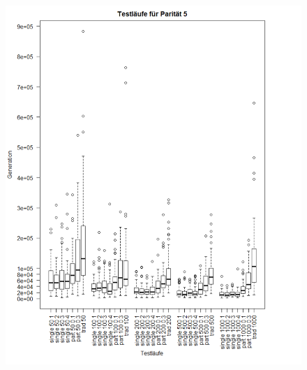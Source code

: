 \begin{figure}[h !]
\hspace*{-2.0cm}	\includegraphics[scale=0.5]{parity5plotzoomed}
\caption[Testläufe Parität 5]{}
\end{figure}

